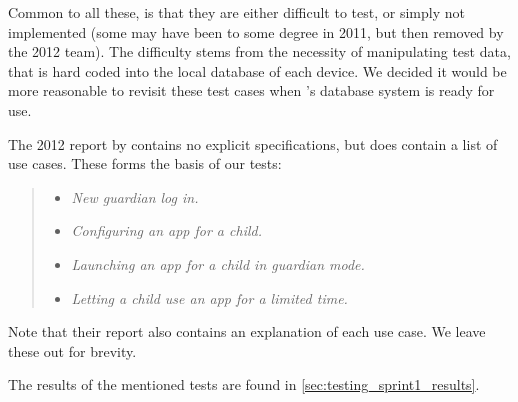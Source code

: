 Common to all these, is that they are either difficult to test, or simply not implemented (some may have been to some degree in 2011, but then removed by the 2012 team).
The difficulty stems from the necessity of manipulating test data, that is hard coded into the local database of each device. 
We decided it would be more reasonable to revisit these test cases when \giraf's database system is ready for use.

The 2012 report by \citet{launcher2012} contains no explicit specifications, but does contain a list of use cases. 
These forms the basis of our tests:

\begin{quote}
\begin{itemize}
	\item \textit{New guardian log in.}
	\item \textit{Configuring an app for a child.}
	\item \textit{Launching an app for a child in guardian mode.}
	\item \textit{Letting a child use an app for a limited time.}
\end{itemize}
\end{quote}

Note that their report also contains an explanation of each use case. 
We leave these out for brevity.

The results of the mentioned tests are found in \cref{sec:testing_sprint1_results}.
